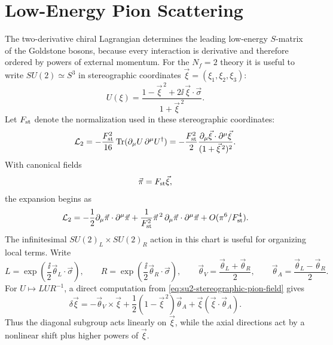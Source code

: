 \section{Low-Energy Pion Scattering}

The two-derivative chiral Lagrangian determines the leading low-energy
\(S\)-matrix of the Goldstone bosons, because every interaction is derivative
and therefore ordered by powers of external momentum.  For the \(N_f=2\)
theory it is useful
to write \(SU(2)\simeq S^3\) in stereographic coordinates
\(\vec\xi=(\xi_1,\xi_2,\xi_3)\):
\begin{equation}
  U(\xi)
  =
  \frac{1-\vec\xi^{\,2}+2\ii\,\vec\xi\cdot\vec\sigma}
       {1+\vec\xi^{\,2}} .
  \label{eq:su2-stereographic-pion-field}
\end{equation}
Let \(F_{\rm st}\) denote the normalization used in these stereographic
coordinates:
\begin{equation}
  \mathcal L_2
  =
  -\frac{F_{\rm st}^2}{16}
  \operatorname{Tr}(\partial_\mu U\,\partial^\mu U^\dagger)
  =
  -\frac{F_{\rm st}^2}{2}
  \frac{\partial_\mu\vec\xi\cdot\partial^\mu\vec\xi}
       {(1+\vec\xi^{\,2})^2}.
  \label{eq:su2-stereographic-lagrangian}
\end{equation}
With canonical fields
\[
  \vec\pi=F_{\rm st}\vec\xi,
\]
the expansion begins as
\begin{equation}
  \mathcal L_2
  =
  -\frac12\partial_\mu\vec\pi\cdot\partial^\mu\vec\pi
  +
  \frac1{F_{\rm st}^2}
  \vec\pi^{\,2}\,
  \partial_\mu\vec\pi\cdot\partial^\mu\vec\pi
  +O(\pi^6/F_{\rm st}^4).
  \label{eq:su2-stereographic-expansion}
\end{equation}
The infinitesimal \(SU(2)_L\times SU(2)_R\) action in this chart is useful for
organizing local terms.  Write
\[
  L=\exp\!\left(\frac{\ii}{2}\vec\theta_L\cdot\vec\sigma\right),
  \qquad
  R=\exp\!\left(\frac{\ii}{2}\vec\theta_R\cdot\vec\sigma\right),
  \qquad
  \vec\theta_V=\frac{\vec\theta_L+\vec\theta_R}{2},
  \qquad
  \vec\theta_A=\frac{\vec\theta_L-\vec\theta_R}{2}.
\]
For \(U\mapsto LUR^{-1}\), a direct computation from
\eqref{eq:su2-stereographic-pion-field} gives
\begin{equation}
  \delta\vec\xi
  =
  -\vec\theta_V\times\vec\xi
  +\frac12(1-\vec\xi^{\,2})\vec\theta_A
  +\vec\xi(\vec\xi\cdot\vec\theta_A).
  \label{eq:su2-stereographic-chiral-transformation}
\end{equation}
Thus the diagonal subgroup acts linearly on \(\vec\xi\), while the axial
directions act by a nonlinear shift plus higher powers of \(\vec\xi\).
